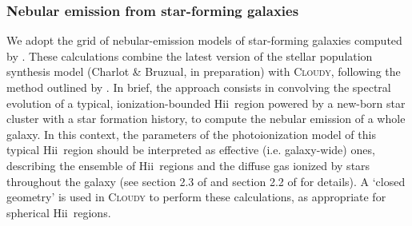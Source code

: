 \documentclass[fleqn,usenatbib]{mnras}
\newcommand{\hii}{\hbox{H{\sc ii}}}
\begin{document}
\subsubsection{Nebular emission from star-forming galaxies}\label{emlines_sf}

We adopt the grid of nebular-emission models of
star-forming galaxies computed by \citet{Gutkin16}. These calculations
combine the latest version of the \citet{Bruzual03} stellar
population synthesis model (Charlot \& Bruzual, in preparation) with
\textsc{Cloudy}, following the method outlined by
\citet{Charlot01}. In brief, the approach consists in convolving the spectral
evolution of a typical, ionization-bounded \hii\ region powered by a
new-born star cluster with a star formation history, to compute the nebular
emission of a whole galaxy. In this context, the parameters of the
photoionization model  of this typical \hii\ region should be interpreted as effective
(i.e. galaxy-wide) ones, describing the ensemble of \hii\ regions and
the diffuse gas ionized by stars throughout the galaxy (see 
section 2.3 of \citealt{Charlot01} and section 2.2 of
\citealt{Gutkin16} for details). A `closed geometry' is used in
\textsc{Cloudy} to perform these calculations, as appropriate for
spherical \hii\ regions.  
\end{document}
